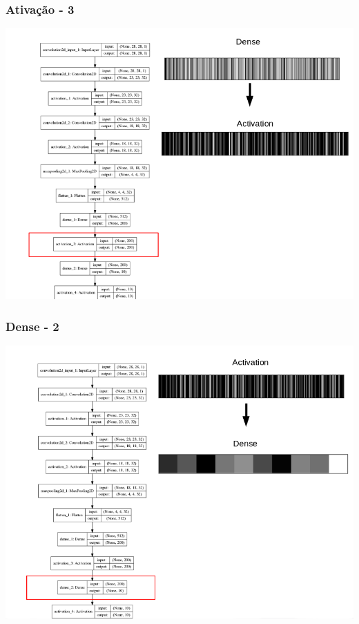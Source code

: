 \documentclass[tikz,11pt]{beamer}
\begin{document}
\begin{frame}
	\frametitle{Ativação - 3}
	\centering
	\includegraphics[height=.8\paperheight]{images/fabio/ativ_3}
\end{frame}

\begin{frame}
	\frametitle{Dense - 2}
	\centering
	\includegraphics[height=.8\paperheight]{images/fabio/dense2}
\end{frame}
\end{document}
